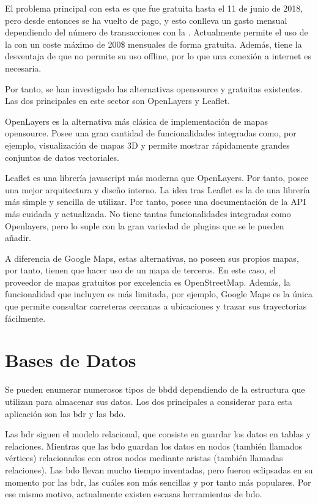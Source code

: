     El problema principal con esta  es que fue gratuita hasta el 11 de junio de 2018, pero desde entonces se ha vuelto de pago, y esto conlleva un gasto mensual dependiendo del número de transacciones con la . Actualmente permite el uso de la  con un coste máximo de 200\$ mensuales de forma gratuita. Además, tiene la desventaja de que no permite su uso offline, por lo que una conexión a internet es necesaria.

    
    Por tanto, se han investigado las alternativas opensource y gratuitas existentes. Las dos  principales en este sector son OpenLayers\cite{openlayers} y Leaflet\cite{leaflet}.
    
    OpenLayers es la alternativa más clásica de implementación de mapas opensource. Posee una gran cantidad de funcionalidades integradas como, por ejemplo, visualización de mapas 3D y permite mostrar rápidamente grandes conjuntos de datos vectoriales.
    
    Leaflet es una librería javascript más moderna que OpenLayers. Por tanto, posee una mejor arquitectura y diseño interno. La idea tras Leaflet es la de una librería más simple y sencilla de utilizar. Por tanto, posee una documentación de la API más cuidada y actualizada. No tiene tantas funcionalidades integradas como Openlayers, pero lo suple con la gran variedad de plugins que se le pueden añadir.
    
    A diferencia de Google Maps, estas alternativas, no poseen sus propios mapas, por tanto, tienen que hacer uso de un mapa de terceros. En este caso, el proveedor de mapas gratuitos por excelencia es OpenStreetMap\cite{osm}. Además, la funcionalidad que incluyen es más limitada, por ejemplo, Google Maps es la única que permite consultar carreteras cercanas a ubicaciones y trazar sus trayectorias fácilmente.
  
  \section{Bases de Datos}
    Se pueden enumerar numerosos tipos de \ac{bbdd} dependiendo de la estructura que utilizan para almacenar sus datos. Los dos principales a considerar para esta aplicación son las \ac{bdr} y las \ac{bdo}.
    
    Las \ac{bdr} siguen el modelo relacional, que consiste en guardar los datos en tablas y relaciones. Mientras que las \ac{bdo} guardan los datos en nodos (también llamados vértices) relacionados con otros nodos mediante aristas (también llamadas relaciones). Las \ac{bdo} llevan mucho tiempo inventadas, pero fueron eclipsadas en su momento por las \ac{bdr}, las cuáles son más sencillas y por tanto más populares. Por ese mismo motivo, actualmente existen escasas herramientas de \ac{bdo}.
    
